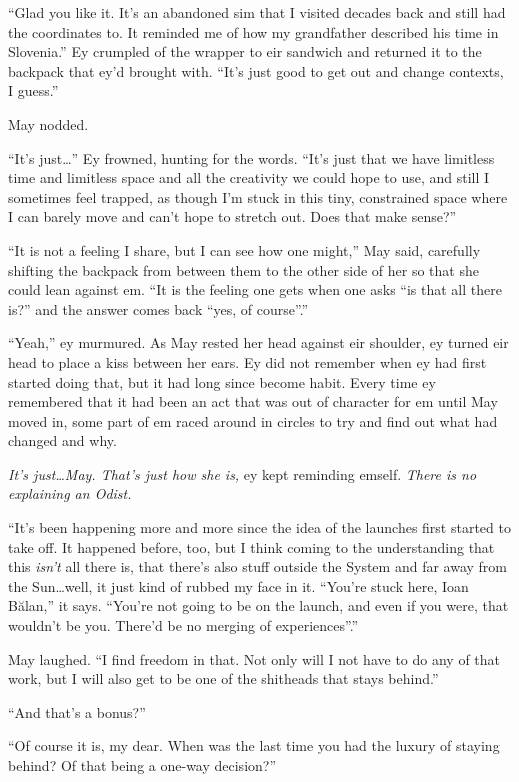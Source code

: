 ``Glad you like it. It's an abandoned sim that I visited decades back and still had the coordinates to. It reminded me of how my grandfather described his time in Slovenia.'' Ey crumpled of the wrapper to eir sandwich and returned it to the backpack that ey'd brought with. ``It's just good to get out and change contexts, I guess.''

May nodded.

``It's just\ldots{}'' Ey frowned, hunting for the words. ``It's just that we have limitless time and limitless space and all the creativity we could hope to use, and still I sometimes feel trapped, as though I'm stuck in this tiny, constrained space where I can barely move and can't hope to stretch out. Does that make sense?''

``It is not a feeling I share, but I can see how one might,'' May said, carefully shifting the backpack from between them to the other side of her so that she could lean against em. ``It is the feeling one gets when one asks ``is that all there is?'' and the answer comes back ``yes, of course''.''

``Yeah,'' ey murmured. As May rested her head against eir shoulder, ey turned eir head to place a kiss between her ears. Ey did not remember when ey had first started doing that, but it had long since become habit. Every time ey remembered that it had been an act that was out of character for em until May moved in, some part of em raced around in circles to try and find out what had changed and why.

\emph{It's just\ldots May. That's just how she is,} ey kept reminding emself. \emph{There is no explaining an Odist.}

``It's been happening more and more since the idea of the launches first started to take off. It happened before, too, but I think coming to the understanding that this \emph{isn't} all there is, that there's also stuff outside the System and far away from the Sun\ldots well, it just kind of rubbed my face in it. ``You're stuck here, Ioan Bălan,'' it says. ``You're not going to be on the launch, and even if you were, that wouldn't be you. There'd be no merging of experiences''.''

May laughed. ``I find freedom in that. Not only will I not have to do any of that work, but I will also get to be one of the shitheads that stays behind.''

``And that's a bonus?''

``Of course it is, my dear. When was the last time you had the luxury of staying behind? Of that being a one-way decision?''

